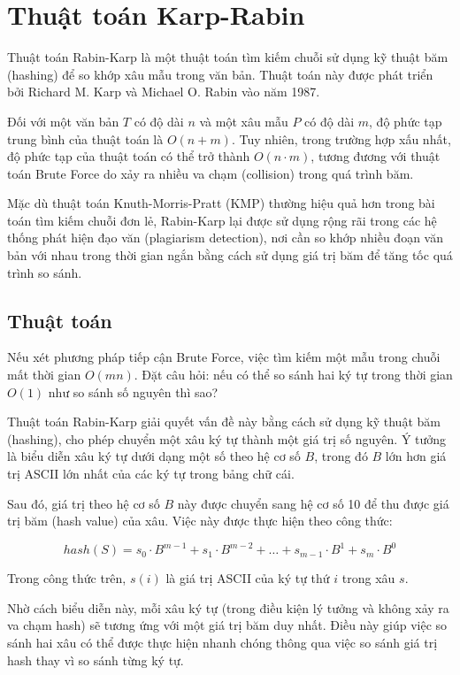 \section{Thuật toán Karp-Rabin}

Thuật toán Rabin-Karp là một thuật toán tìm kiếm chuỗi sử dụng kỹ thuật băm (hashing) để so khớp xâu mẫu trong văn bản. Thuật toán này được phát triển bởi Richard M. Karp và Michael O. Rabin vào năm 1987.

Đối với một văn bản $T$ có độ dài $n$ và một xâu mẫu $P$ có độ dài $m$, độ phức tạp trung bình của thuật toán là $O(n + m)$. Tuy nhiên, trong trường hợp xấu nhất, độ phức tạp của thuật toán có thể trở thành $O(n \cdot m)$, tương đương với thuật toán Brute Force do xảy ra nhiều va chạm (collision) trong quá trình băm.

Mặc dù thuật toán Knuth-Morris-Pratt (KMP) thường hiệu quả hơn trong bài toán tìm kiếm chuỗi đơn lẻ, Rabin-Karp lại được sử dụng rộng rãi trong các hệ thống phát hiện đạo văn (plagiarism detection), nơi cần so khớp nhiều đoạn văn bản với nhau trong thời gian ngắn bằng cách sử dụng giá trị băm để tăng tốc quá trình so sánh.

\subsection{Thuật toán}

Nếu xét phương pháp tiếp cận Brute Force, việc tìm kiếm một mẫu trong chuỗi mất thời gian $O(mn)$. Đặt câu hỏi: nếu có thể so sánh hai ký tự trong thời gian $O(1)$ như so sánh số nguyên thì sao?

Thuật toán Rabin-Karp giải quyết vấn đề này bằng cách sử dụng kỹ thuật băm (hashing), cho phép chuyển một xâu ký tự thành một giá trị số nguyên. Ý tưởng là biểu diễn xâu ký tự dưới dạng một số theo hệ cơ số $B$, trong đó $B$ lớn hơn giá trị ASCII lớn nhất của các ký tự trong bảng chữ cái.

Sau đó, giá trị theo hệ cơ số $B$ này được chuyển sang hệ cơ số 10 để thu được giá trị băm (hash value) của xâu. Việc này được thực hiện theo công thức:

\[
hash(S) = s_0 \cdot B^{m - 1} + s_1 \cdot B^{m-2} + \dots + s_{m - 1} \cdot B^{1} + s_m \cdot B^{0}
\]

Trong công thức trên, $s(i)$ là giá trị ASCII của ký tự thứ $i$ trong xâu $s$.

Nhờ cách biểu diễn này, mỗi xâu ký tự (trong điều kiện lý tưởng và không xảy ra va chạm hash) sẽ tương ứng với một giá trị băm duy nhất. Điều này giúp việc so sánh hai xâu có thể được thực hiện nhanh chóng thông qua việc so sánh giá trị hash thay vì so sánh từng ký tự.

